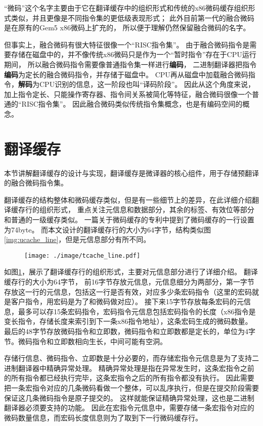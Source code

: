 “微码”这个名字主要由于它在翻译缓存中的组织形式和传统的x86微码缓存组织形式类似，并且更像是不同指令集的更低级表现形式；
此外目前第一代的融合微码是在原有的Gem5 x86微码上扩充的，
所以便于理解仍然保留融合微码的名字。

但事实上，融合微码有很大特征很像一个“RISC指令集”。
由于融合微码指令是需要存储在磁盘中的，并不像传统x86微码只是作为一个“暂时指令”存在于CPU运行期间，
所以融合微码指令需要像普通指令集一样进行\textbf{编码}，
二进制翻译器把指令\textbf{编码}为定长的融合微码指令，并存储于磁盘中。
CPU再从磁盘中加载融合微码指令，\textbf{解码}为CPU识别的信息，这一阶段也叫“译码阶段”。
因此从这个角度来说，加上指令定长、只能操作寄存器、指令间关系被简化等特征，融合微码很像一个普通的“RISC指令集”。
因此融合微码类似传统指令集概念，也是有编码空间的概念。

\section{翻译缓存}\label{sec:tcache}

本节讲解翻译缓存的设计与实现，翻译缓存是微译器的核心组件，用于存储预翻译的融合微码指令集。

翻译缓存的结构整体和微码缓存类似，但是有一些细节上的差异，在此详细介绍翻译缓存行的组织形式，
重点关注元信息和数据部分，其余的标签、有效位等部分和普通的一级缓存类似。
一篇关于微码缓存的专利\cite{uopPatent}中提到了微码缓存的一行设置为74byte。
而本文设计的翻译缓存行的大小为64字节，结构类似图\ref{img:ucache_line}，但是元信息部分有所不同。

\begin{figure}[!htbp]
  \centering
  \texttt{[image: ./image/tcache\_line.pdf]}
  \label{img:tcache_line}
\end{figure}

如图\ref{img:tcache_line}，展示了翻译缓存行的组织形式，主要对元信息部分进行了详细介绍。
翻译缓存行的大小为64字节，
前16字节存放元信息，元信息细分为两部分，第一字节存放这一行的元信息，包括这一行是否有效，对应多少条宏码指令（这里的宏码就是客户指令，用宏码是为了和微码做对应）。
接下来15字节存放每条宏码的元信息，最多可以存15条宏码指令，宏码指令元信息包括宏码指令的长度（x86指令是变长指令，存储长度来索引到下一条x86指令地址），这条宏码生成的微码数量。
最后的48字节存放微码指令和立即数，微码指令和立即数都是定长的，单位为4字节。微码指令和立即数相向生长，中间可能有空洞。

存储行信息、微码指令、立即数是十分必要的，而存储宏指令元信息是为了支持二进制翻译器中精确异常处理。
精确异常处理是指在异常发生时，这条宏指令之前的所有指令都已经执行完毕，这条宏指令之后的所有指令都没有执行。
因此需要把一条宏指令对应的几条微码看做一个整体，可以乱序执行，但是在提交阶段需要保证这几条微码指令是原子提交的。
这样就能保证精确异常处理，这也是二进制翻译器必须要支持的功能。
因此在宏指令元信息中，需要存储一条宏指令对应的微码数量信息，而宏码长度信息则为了取到下一行微码缓存行。


